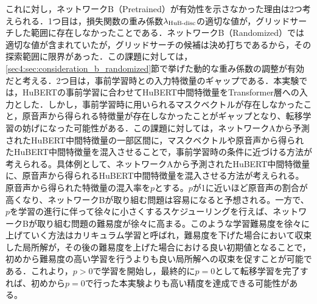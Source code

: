 これに対し，ネットワークB（Pretrained）が有効性を示さなかった理由は2つ考えられる．1つ目は，損失関数の重み係数$\lambda_{\text{HuB-disc}}$の適切な値が，グリッドサーチした範囲に存在しなかったことである．ネットワークB（Randomized）では適切な値が含まれていたが，グリッドサーチの候補は決め打ちであるから，その探索範囲に限界があった．この課題に対しては，\ref{sec4:sec:consideration_b_randomized}節で挙げた動的な重み係数の調整が有効だと考える．2つ目は，事前学習時との入力特徴量のギャップである．本実験では，HuBERTの事前学習に合わせてHuBERT中間特徴量をTransformer層への入力とした．しかし，事前学習時に用いられるマスクベクトルが存在しなかったこと，原音声から得られる特徴量が存在しなかったことがギャップとなり、転移学習の妨げになった可能性がある．この課題に対しては，ネットワークAから予測されたHuBERT中間特徴量の一部区間に，マスクベクトルや原音声から得られたHuBERT中間特徴量を混入させることで，事前学習時の条件に近づける方法が考えられる。具体例として、ネットワークAから予測されたHuBERT中間特徴量に、原音声から得られるHuBERT中間特徴量を混入させる方法が考えられる。原音声から得られた特徴量の混入率を$p$とする。$p$が1に近いほど原音声の割合が高くなり、ネットワークBが取り組む問題は容易になると予想される。一方で、$p$を学習の進行に伴って徐々に小さくするスケジューリングを行えば、ネットワークBが取り組む問題の難易度が徐々に高まる。このような学習難易度を徐々に上げていく方法はカリキュラム学習と呼ばれ，難易度を下げた場合において収束した局所解が，その後の難易度を上げた場合における良い初期値となることで，初めから難易度の高い学習を行うよりも良い局所解への収束を促すことが可能である\cite{wang2021survey}．これより，$p > 0$で学習を開始し，最終的に$p = 0$として転移学習を完了すれば、初めから$p = 0$で行った本実験よりも高い精度を達成できる可能性がある。
